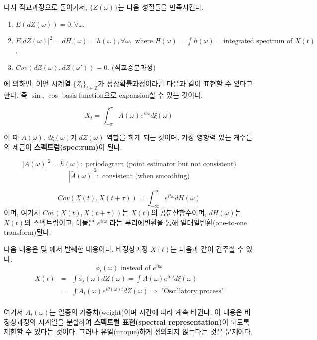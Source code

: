 \documentclass[b5paper,]{scrbook}
\theoremstyle{plain}
\theoremstyle{definition}
\numberwithin{equation}{section}
\begin{document}
다시 직교과정으로 돌아가서, \(\{Z(\omega)\}\)는 다음 성질들을 만족시킨다.

\begin{enumerate}
\def\labelenumi{\arabic{enumi}.}
\item
  \(E(dZ(\omega))=0, \forall \omega\).
\item
  \(E|dZ(\omega)|^{2}=d H(\omega)=h(\omega), \forall \omega, \text{ where } H(\omega)=\int h(\omega)=\text{integrated spectrum of } X(t)\).
\item
  \(Cov(dZ(\omega), dZ(\omega'))=0\). (직교증분과정)
\end{enumerate}

\citep{Nason2010}에 의하면, 어떤 시계열 \(\{Z_{t} \}_{t\in \mathbb{Z}}\)가 정상확률과정이라면 다음과 같이 표현할 수 있다고 한다. 즉 \(\sin\), \(\cos\) basis function으로 expansion할 수 있는 것이다.

\begin{equation}
X_{t}=\int_{-\pi}^{\pi}A(\omega)e^{it\omega}d\xi(\omega)
\end{equation}

이 때 \(A(\omega)\), \(d\xi(\omega)\)가 \(dZ(\omega)\) 역할을 하게 되는 것이며, 가장 영향력 있는 계수들의 제곱이 \textbf{스펙트럼(spectrum)}이 된다.

\[|A(\omega)|^{2}=\hat{h}(\omega): \text{ periodogram (point estimator but not consistent)}\]
\[|\tilde{A}(\omega)|^{2}: \text{ consistent (when smoothing)}\]

\[Cov(X(t), X(t+\tau))=\int_{-\infty}^{\infty}e^{it\omega}dH(\omega)\]
이며, 여기서 \(Cov(X(t), X(t+\tau))\)는 \(X(t)\)의 공분산함수이며, \(dH(\omega)\)는 \(X(t)\)의 스펙트럼이고, 이들은 \(e^{it\omega}\) 라는 푸리에변환을 통해 일대일변환(one-to-one transform)된다.

다음 내용은 \citep{Priestley1981} 및 \citep{Dahlhaus1996}에서 발췌한 내용이다. 비정상과정 \(X(t)\)는 다음과 같이 간주할 수 있다.
\[\phi_{t}(\omega) \text{ instead of } e^{it\omega}\]
\begin{eqnarray*}
X(t)&=&\int \phi_{t}(\omega)dZ(\omega)=\int A(\omega)e^{it\omega}d\xi(\omega)\\
&=&\int A_{t}(\omega)e^{i\theta(\omega)t}dZ(\omega) \Longrightarrow \text{ "Oscillatory process"}\\
\end{eqnarray*}

여기서 \(A_{t}(\omega)\)는 일종의 가중치(weight)이며 시간에 따라 계속 바뀐다. 이 내용은 비정상과정의 시계열을 분할하여 \textbf{스펙트럴 표현(spectral representation)}이 되도록 제한할 수 있다는 것이다. 그러나 유일(unique)하게 정의되지 않는다는 것은 문제이다.
\end{document}
